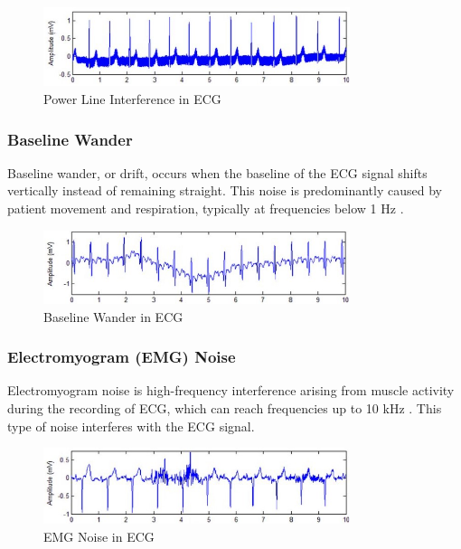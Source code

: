 \begin{figure}[h]
	\centering
	\includegraphics[width=0.8\textwidth]{images/powerline noise}
	\caption{Power Line Interference in ECG \cite{Maggio2012Quantification}}
	\label{fig:power_line_interference}
\end{figure}

\subsubsection{Baseline Wander}
\vspace{1em}
\noindent Baseline wander, or drift, occurs when the baseline of the ECG signal shifts vertically instead of remaining straight. This noise is predominantly caused by patient movement and respiration, typically at frequencies below 1 Hz \cite{Kher2019SignalPT}.

\begin{figure}[h]
	\centering
	\includegraphics[width=0.8\textwidth]{images/baseline wander}
	\caption{Baseline Wander in ECG \cite{Maggio2012Quantification}}
	\label{fig:baseline_wander}
\end{figure}

\subsubsection{Electromyogram (EMG) Noise}
\vspace{1em}
\noindent Electromyogram noise is high-frequency interference arising from muscle activity during the recording of ECG, which can reach frequencies up to 10 kHz \cite{Velayudhan2016NoiseAA,Kher2019SignalPT}. This type of noise interferes with the ECG signal.

\begin{figure}[h]
	\centering
	\includegraphics[width=0.8\textwidth]{images/emg_noise}
	\caption{EMG Noise in ECG \cite{Maggio2012Quantification}}
	\label{fig:emg_noise}
\end{figure}

